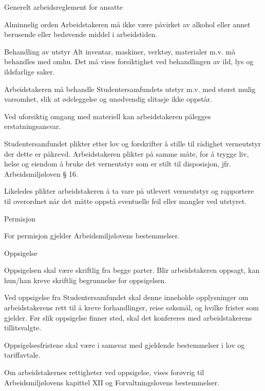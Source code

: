 \begin{lovkapittel}{Generelt arbeidsreglement for ansatte}
\begin{lovparagraf}{Alminnelig orden}
        Arbeidstakeren må ikke være påvirket av alkohol eller annet berusende eller bedøvende middel i arbeidstiden.
    \end{lovparagraf}

    \begin{lovparagraf}{Behandling av utstyr}
        Alt inventar, maskiner, verktøy, materialer m.v. må behandles med omhu. Det må vises forsiktighet ved behandlingen
        av ild, lys og ildsfarlige saker.

        Arbeidstakeren må behandle Studentersamfundets utstyr m.v. med størst mulig varsomhet, slik at ødeleggelse og
        unødvendig slitasje ikke oppstår.

        Ved uforsiktig omgang med materiell kan arbeidstakeren pålegges erstatningsansvar.

        Studentersamfundet plikter etter lov og forskrifter å stille til rådighet verneutstyr der dette er påkrevd. Arbeidstakeren
        plikter på samme måte, for å trygge liv, helse og eiendom å bruke det verneutstyr som er stilt til disposisjon, jfr.
        Arbeidsmiljøloven § 16.

        Likeledes plikter arbeidstakeren å ta vare på utlevert verneutstyr og rapportere til overordnet når det måtte oppstå
        eventuelle feil eller mangler ved utstyret.

    \end{lovparagraf}

    \begin{lovparagraf}{Permisjon}

        For permisjon gjelder Arbeidsmiljølovens bestemmelser.

    \end{lovparagraf}

    \begin{lovparagraf}{Oppsigelse}

        Oppsigelsen skal være skriftlig fra begge parter. Blir arbeidstakeren oppsagt, kan hun/han kreve skriftlig begrunnelse
        for oppsigelsen.

        Ved oppsigelse fra Studentersamfundet skal denne inneholde opplysninger om arbeidstakerens rett til å kreve
        forhandlinger, reise søksmål, og hvilke frister som gjelder. Før slik oppsigelse finner sted, skal det konfereres med
        arbeidstakerens tillitsvalgte.

        Oppsigelsesfristene skal være i samsvar med gjeldende bestemmelser i lov og tariffavtale.

        Om arbeidstakernes rettigheter ved oppsigelse, vises forøvrig til Arbeidsmiljølovens kapittel XII og
        Forvaltningslovens bestemmelser.


\end{lovparagraf}
\end{lovkapittel}
